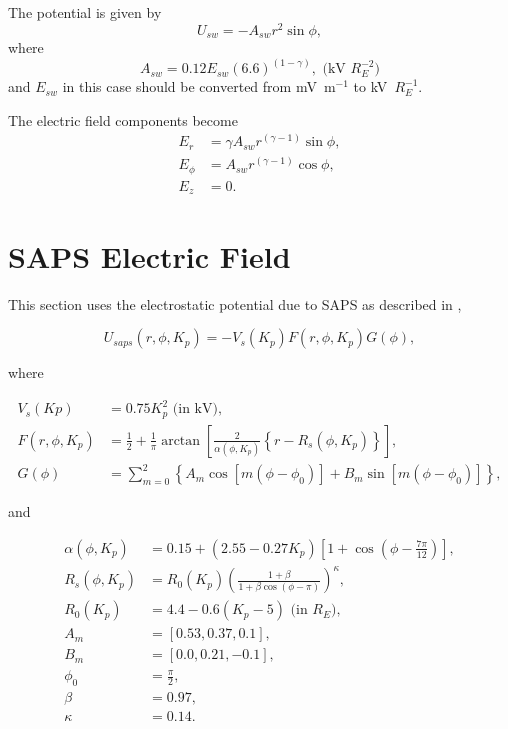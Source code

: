 \documentclass[]{article}
\begin{document}
The potential is given by 
\begin{equation}
	U_{sw} = -A_{sw} r^2 \sin{\phi},
\end{equation}
where 
\begin{equation}
	A_{sw} = 0.12 E_{sw} (6.6)^{(1-\gamma)}, \text{ (kV $R_E^{-2}$)}
\end{equation}
and $E_{sw}$ in this case should be converted from mV~m$^{-1}$ to kV~$R_E^{-1}$.

The electric field components become
\begin{align}
E_r &= \gamma A_{sw} r^{(\gamma-1)}\sin{\phi},\\
E_\phi &= A_{sw} r^{(\gamma-1)} \cos{\phi},\\
E_z &= 0.
\end{align}


\section{SAPS Electric Field}
	\label{SectSAPS}
	This section uses the electrostatic potential due to SAPS as described in \citet{Goldstein2005},
	
	\begin{equation}
		U_{saps}(r,\phi,K_p) = -V_s(K_p) F(r,\phi,K_p) G(\phi),
	\end{equation}

	where
	
	\begin{align}
		V_s(Kp) &= 0.75 K_p^2 \text{ (in kV)}, \\
		F(r,\phi,K_p) &= \frac{1}{2} + \frac{1}{\pi}\arctan{\left[\frac{2}{\alpha(\phi,K_p)}\left\{ r - R_s(\phi,K_p)\right\}\right]}, \\
		G(\phi) &= \sum_{m=0}^{2} \left\{A_m \cos{[m(\phi - \phi_0)]} + B_m \sin{[m(\phi-\phi_0)]} \right\},
	\end{align}
	
	and
	
	\begin{align}
		\alpha(\phi,K_p) &= 0.15 + (2.55 - 0.27 K_p)\left[1 + \cos{\left(\phi - \frac{7\pi}{12}\right)}\right], \\
		R_s(\phi,K_p) &= R_0(K_p)\left(\frac{1+\beta}{1 + \beta\cos{(\phi-\pi)}}\right)^\kappa, \\
		R_0(K_p) &= 4.4 - 0.6(K_p - 5) \text{ (in $R_E$)},\\
		A_m &= [0.53,0.37,0.1],\\
		B_m &= [0.0,0.21,-0.1],\\
		\phi_0 &= \frac{\pi}{2}, \\
		\beta &= 0.97,\\
		\kappa &= 0.14.
	\end{align}
	
\end{document}
